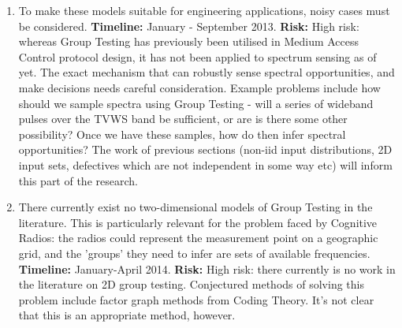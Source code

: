 \documentclass[conference]{IEEEtran}
\begin{document}
\begin{enumerate}
\item To make these models suitable for engineering applications, noisy cases must be considered. \textbf{Timeline: } January - September 2013. \textbf{Risk: } High risk: whereas Group Testing has previously been utilised in Medium Access Control protocol design, it has not been applied to spectrum sensing as of yet. The exact mechanism that can robustly sense spectral opportunities, and make decisions needs careful consideration. Example problems include how should we sample spectra using Group Testing - will a series of wideband pulses over the TVWS band be sufficient, or are is there some other possibility? Once we have these samples, how do then infer spectral opportunities? The work of previous sections (non-iid input distributions, 2D input sets, defectives which are not independent in some way etc) will inform this part of the research. 

\item There currently exist no two-dimensional models of Group Testing in the literature. This is particularly relevant for the problem faced by Cognitive Radios: the radios could represent the measurement point on a geographic grid, and the 'groups' they need to infer are sets of available frequencies. \textbf{Timeline: }  January-April 2014. \textbf{Risk: } High risk: there currently is no work in the literature on 2D group testing. Conjectured methods of solving this problem include factor graph methods from Coding Theory. It's not clear that this is an appropriate method, however.

\end{enumerate}


\end{document}
